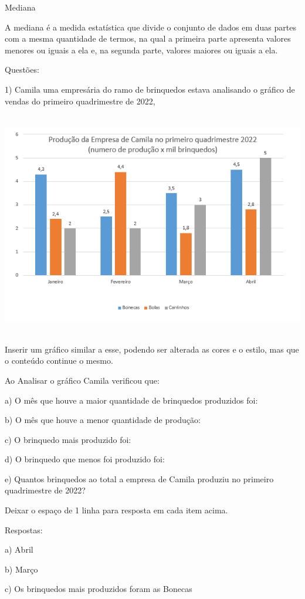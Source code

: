 Mediana

A mediana é a medida estatística que divide o conjunto de dados em duas
partes com a mesma quantidade de termos, na qual a primeira parte
apresenta valores menores ou iguais a ela e, na segunda parte, valores
maiores ou iguais a ela.

Questões:

1) Camila uma empresária do ramo de brinquedos estava analisando o
gráfico de vendas do primeiro quadrimestre de 2022,

\includegraphics[width=5.90625in,height=3.86458in]{./imgSAEB_8_MAT/media/image39.png}

Inserir um gráfico similar a esse, podendo ser alterada as cores e o
estilo, mas que o conteúdo continue o mesmo.

Ao Analisar o gráfico Camila verificou que:

a) O mês que houve a maior quantidade de brinquedos produzidos foi:

b) O mês que houve a menor quantidade de produção:

c) O brinquedo mais produzido foi:

d) O brinquedo que menos foi produzido foi:

e) Quantos brinquedos ao total a empresa de Camila produziu no primeiro
quadrimestre de 2022?

Deixar o espaço de 1 linha para resposta em cada item acima.

Respostas:

a) Abril

b) Março

c) Os brinquedos mais produzidos foram as Bonecas

